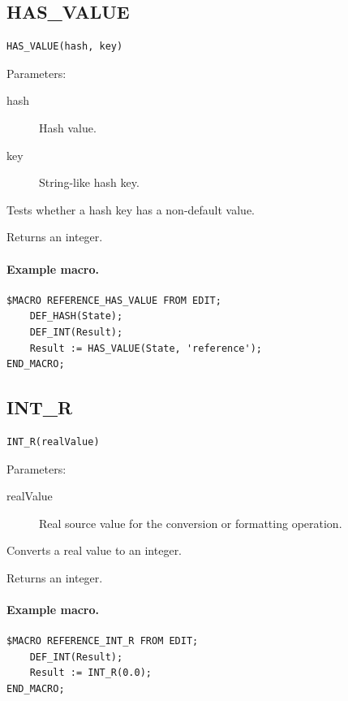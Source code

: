 \documentclass[a4paper,10pt,twoside,openany]{book}
\newenvironment{mrmacextension}{\begin{changebar}}{\end{changebar}}
\begin{document}
\begin{mrmacextension}
\label{prim:intrinsic-has-value}
\subsection*{HAS\_VALUE}
\begin{verbatim}
HAS_VALUE(hash, key)
\end{verbatim}
Parameters:
\begin{description}
\item[hash] Hash value.
\item[key] String-like hash key.
\end{description}

Tests whether a hash key has a non-default value.

Returns an integer.

\paragraph{Example macro.}
\begin{verbatim}
$MACRO REFERENCE_HAS_VALUE FROM EDIT;
    DEF_HASH(State);
    DEF_INT(Result);
    Result := HAS_VALUE(State, 'reference');
END_MACRO;
\end{verbatim}
\end{mrmacextension}

\label{prim:intrinsic-int-r}
\subsection*{INT\_R}
\begin{verbatim}
INT_R(realValue)
\end{verbatim}
Parameters:
\begin{description}
\item[realValue] Real source value for the conversion or formatting operation.
\end{description}

Converts a real value to an integer.

Returns an integer.

\paragraph{Example macro.}
\begin{verbatim}
$MACRO REFERENCE_INT_R FROM EDIT;
    DEF_INT(Result);
    Result := INT_R(0.0);
END_MACRO;
\end{verbatim}
\end{document}
